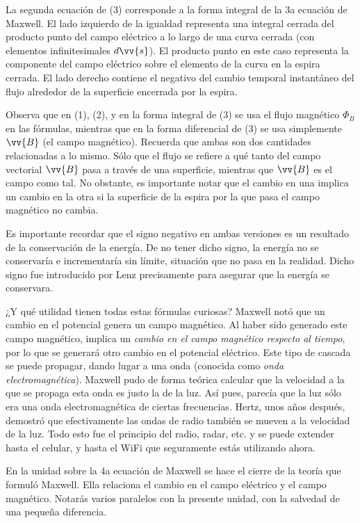 \documentclass{article}
\begin{document}
La segunda ecuación de (3) corresponde a la forma integral de la 3a ecuación de Maxwell. El lado izquierdo de la igualdad representa una integral cerrada del producto punto del campo eléctrico a lo largo de una curva cerrada (con elementos infinitesimales $d\vv{s}$). El producto punto en este caso representa la componente del campo eléctrico sobre el elemento de la curva en la espira cerrada. El lado derecho contiene el negativo del cambio temporal instantáneo del flujo alrededor de la superficie encerrada por la espira.\bigskip

Observa que en (1), (2), y en la forma integral de (3) se usa el flujo magnético $\Phi_B$ en las fórmulas, mientras que en la forma diferencial de (3) se usa simplemente $\vv{B}$ (el campo magnético). Recuerda que ambas son dos cantidades relacionadas a lo mismo. Sólo que el flujo se refiere a qué tanto del campo vectorial $\vv{B}$ pasa a través de una superficie, mientras que $\vv{B}$ es el campo como tal. No obstante, es importante notar que el cambio en una implica un cambio en la otra si la superficie de la espira por la que pasa el campo magnético no cambia.\bigskip

Es importante recordar que el signo negativo en ambas versiones es un resultado de la conservación de la energía. De no tener dicho signo, la energía no se conservaría e incrementaría sin límite, situación que no pasa en la realidad. Dicho signo fue introducido por Lenz precisamente para asegurar que la energía se conservara.\bigskip

¿Y qué utilidad tienen todas estas fórmulas curiosas? Maxwell notó que un cambio en el potencial genera un campo magnético. Al haber sido generado este campo magnético, implica un \emph{cambio en el campo magnético respecto al tiempo}, por lo que se generará otro cambio en el potencial eléctrico. Este tipo de cascada se puede propagar, dando lugar a una onda (conocida como \emph{onda electromagnética}). Maxwell pudo de forma teórica calcular que la velocidad a la que se propaga esta onda es justo la de la luz. Así pues, parecía que la luz sólo era una onda electromagnética de ciertas frecuencias. Hertz, unos años después, demostró que efectivamente las ondas de radio también se mueven a la velocidad de la luz. Todo esto fue el principio del radio, radar, etc. y se puede extender hasta el celular, y hasta el WiFi que seguramente estás utilizando ahora.\bigskip

En la unidad sobre la 4a ecuación de Maxwell se hace el cierre de la teoría que formuló Maxwell. Ella relaciona el cambio en el campo eléctrico y el campo magnético. Notarás varios paralelos con la presente unidad, con la salvedad de una pequeña diferencia.
\end{document}
